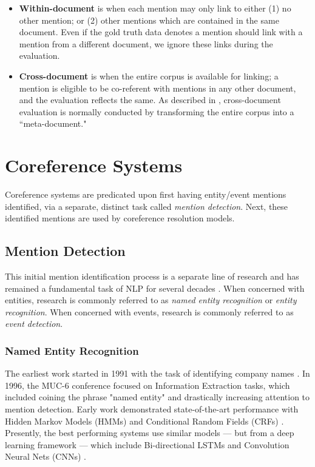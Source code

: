 \begin{itemize}
\item \textbf{Within-document} is when each mention may only link to either (1) no other mention; or (2) other mentions which are contained in the same document.  Even if the gold truth data denotes a mention should link with a mention from a different document, we ignore these links during the evaluation.
\item \textbf{Cross-document} is when the entire corpus is available for linking; a mention is eligible to be co-referent with mentions in any other document, and the evaluation reflects the same.  As described in \cite{revisit:16}, cross-document evaluation is normally conducted by transforming the entire corpus into a ``meta-document."
\end{itemize}

\section{Coreference Systems}
Coreference systems are predicated upon first having entity/event mentions identified, via a separate, distinct task called \textit{mention detection}.  Next, these identified mentions are used by coreference resolution models.

\subsection{Mention Detection}
This initial mention identification process is a separate line of research and has remained a fundamental task of NLP for several decades \cite{ner-sekine2007}.  When concerned with entities, research is commonly referred to as \textit{named entity recognition} or \textit{entity recognition}. When concerned with events, research is commonly referred to as \textit{event detection}.

\subsubsection{Named Entity Recognition}
The earliest work started in 1991 with the task of identifying company names \cite{Rau91}.  In 1996, the MUC-6 conference \cite{Grishman:1996:MUC:992628.992709} focused on Information Extraction tasks, which included coining the phrase "named entity" and drastically increasing attention to mention detection.  Early work demonstrated state-of-the-art performance with Hidden Markov Models (HMMs) \cite{Bikel97nymble:a} and Conditional Random Fields (CRFs) \cite{McCallum:2003:ERN:1119176.1119206}.  Presently, the best performing systems use similar models --- but from a deep learning framework --- which include Bi-directional LSTMs \cite{Hochreiter:1997:LSM:1246443.1246450, DBLP:journals/tacl/ChiuN16} and Convolution Neural Nets (CNNs) \cite{ma-hovy:2016:P16-1}.

